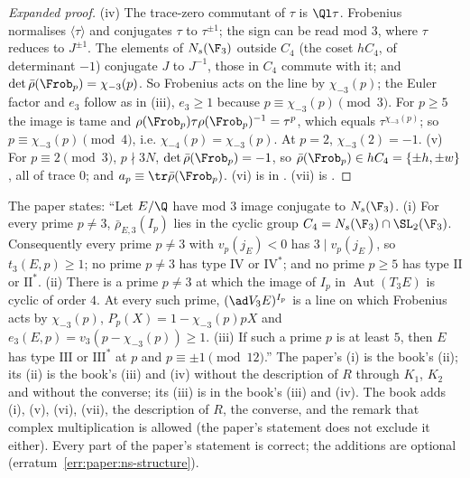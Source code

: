 \begin{sloppypar}
\begin{proof}[Expanded proof]
(iv) The trace-zero commutant of $\tau$ is $\Ql\tau$. Frobenius normalises $\langle\tau\rangle$ and conjugates $\tau$ to $\tau^{\pm1}$; the sign can be read mod $3$, where $\tau$ reduces to $J^{\pm1}$. The
elements of $N_s(\F_3)$ outside $C_4$ (the coset $hC_4$, of determinant $-1$) conjugate $J$ to $J^{-1}$, those in $C_4$ commute with it; and $\det\bar\rho(\Frob_p)=\chi_{-3}(p)$. So Frobenius acts on
the line by $\chi_{-3}(p)$; the Euler factor and $e_3$ follow as in (iii), $e_3\ge1$ because $p\equiv\chi_{-3}(p)\pmod3$. For $p\ge5$ the image is tame and
$\rho(\Frob_p)\tau\rho(\Frob_p)^{-1}=\tau^p$, which equals $\tau^{\chi_{-3}(p)}$; so $p\equiv\chi_{-3}(p)\pmod4$, i.e. $\chi_{-4}(p)=\chi_{-3}(p)$. At $p=2$, $\chi_{-3}(2)=-1$. (v) For $p\equiv2\pmod3$, $p\nmid3N$,
$\det\bar\rho(\Frob_p)=-1$, so $\bar\rho(\Frob_p)\in hC_4=\{\pm h,\pm w\}$, all of trace $0$; and $a_p\equiv\tr\bar\rho(\Frob_p)$. (vi) is in . (vii) is .
\end{proof}

\begin{warning}\label{warn:paper:ns-structure}
The paper states: ``Let $E/\Q$ have mod $3$ image conjugate to $N_s(\F_3)$. (i) For every prime $p\ne3$, $\bar\rho_{E,3}(I_p)$ lies in the cyclic group $C_4=N_s(\F_3)\cap\SL_2(\F_3)$.
Consequently every prime $p\ne3$ with $v_p(j_E)<0$ has $3\mid v_p(j_E)$, so $t_3(E,p)\ge1$; no prime $p\ne3$ has type $\mathrm{IV}$ or $\mathrm{IV}^*$; and no prime $p\ge5$ has type $\mathrm{II}$ or
$\mathrm{II}^*$. (ii) There is a prime $p\ne3$ at which the image of $I_p$ in $\operatorname{Aut}(T_3E)$ is cyclic of order $4$. At every such prime, $(\ad V_3E)^{I_p}$ is a line on which Frobenius
acts by $\chi_{-3}(p)$, $P_p(X)=1-\chi_{-3}(p)pX$ and $e_3(E,p)=v_3(p-\chi_{-3}(p))\ge1$. (iii) If such a prime $p$ is at least $5$, then $E$ has type $\mathrm{III}$ or $\mathrm{III}^*$ at $p$ and
$p\equiv\pm1\pmod{12}$.'' The paper's (i) is the book's (ii); its (ii) is the book's (iii) and (iv) without the description of $R$ through $K_1$, $K_2$ and without the converse; its (iii) is in the
book's (iii) and (iv). The book adds (i), (v), (vi), (vii), the description of $R$, the converse, and the remark that complex multiplication is allowed (the paper's statement does not exclude
it either). Every part of the paper's statement is correct; the additions are optional (erratum~\ref{err:paper:ns-structure}).
\end{warning}


\end{sloppypar}
